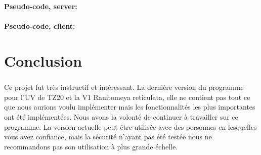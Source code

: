 \documentclass[12pt,a4paper,twoside]{article}
\begin{document}
			\paragraph*{Pseudo-code, server:}
				
				
			\paragraph*{Pseudo-code, client:}
				
				
	\section{Conclusion} %
		\subparagraph*{}
			Ce projet fut très instructif et intéressant. La dernière version du programme pour l'UV de TZ20 et la V1 Ranitomeya reticulata, elle ne contient pas tout ce que nous aurions voulu implémenter mais les fonctionnalités les plus importantes ont été implémentées. Nous avons la volonté de continuer à travailler sur ce programme. La version actuelle peut être utilisée avec des personnes en lesquelles vous avez confiance, mais la sécurité n’ayant pas été testée nous ne recommandons pas son utilisation à plus grande échelle.
\end{document}
